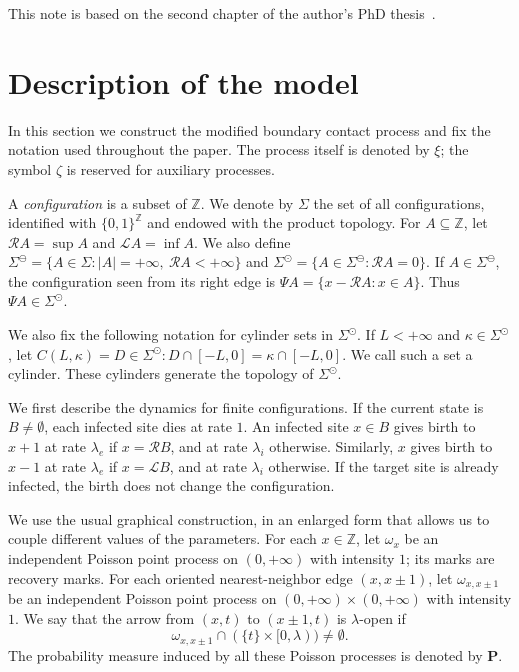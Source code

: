 \documentclass[11pt,a4paper]{article}
\theoremstyle{plain}
\theoremstyle{definition}
\theoremstyle{remark}
\numberwithin{equation}{section}
\begin{document}
	This note is based on the second chapter of the author's PhD thesis~\cite{Terra2024}.
	
	\section{Description of the model} \label{section_descriptioncontact}
	In this section we construct the modified boundary contact process and fix the notation used throughout the paper. The process itself is denoted by $\xi$; the symbol $\zeta$ is reserved for auxiliary processes.
	
	A \emph{configuration} is a subset of $\mathbb{Z}$. We denote by $\Sigma$ the set of all configurations, identified with $\{0,1\}^{\mathbb{Z}}$ and endowed with the product topology. For $A\subseteq\mathbb{Z}$, let $\mathcal{R}A=\sup A$ and $\mathcal{L}A=\inf A$. We also define $
	\Sigma^{\ominus}=\{A\in\Sigma: |A|=+\infty,\ \mathcal{R}A<+\infty\}$ and $\Sigma^{\odot}=\{A\in\Sigma^{\ominus}:\mathcal{R}A=0\}$. If $A\in\Sigma^{\ominus}$, the configuration seen from its right edge is $\Psi A=\{x-\mathcal{R}A:x\in A\}$.
	Thus $\Psi A\in\Sigma^{\odot}$.
	
	We also fix the following notation for cylinder sets in $\Sigma^{\odot}$. If $L<+\infty$ and $\kappa\in\Sigma^{\odot}$, let $C(L,\kappa)={D\in\Sigma^{\odot}:D\cap[-L,0]=\kappa\cap[-L,0]}$. We call such a set a cylinder. These cylinders generate the topology of $\Sigma^{\odot}$.
	
	
	We first describe the dynamics for finite configurations. If the current state is $B\neq\emptyset$, each infected site dies at rate $1$. An infected site $x\in B$ gives birth to $x+1$ at rate $\lambda_e$ if $x=\mathcal{R}B$, and at rate $\lambda_i$ otherwise. Similarly, $x$ gives birth to $x-1$ at rate $\lambda_e$ if $x=\mathcal{L}B$, and at rate $\lambda_i$ otherwise. If the target site is already infected, the birth does not change the configuration.
	
	We use the usual graphical construction, in an enlarged form that allows us to couple different values of the parameters. For each $x\in\mathbb{Z}$, let $\omega_x$ be an independent Poisson point process on $(0,+\infty)$ with intensity $1$; its marks are recovery marks. For each oriented nearest-neighbor edge $(x,x\pm1)$, let $\omega_{x,x\pm1}$ be an independent Poisson point process on $(0,+\infty)\times(0,+\infty)$ with intensity $1$. We say that the arrow from $(x,t)$ to $(x\pm1,t)$ is $\lambda$-open if
	\[
	\omega_{x,x\pm1}\cap(\{t\}\times[0,\lambda))\neq\emptyset.
	\]
	The probability measure induced by all these Poisson processes is denoted by $\mathbf{P}$.
	
\end{document}
